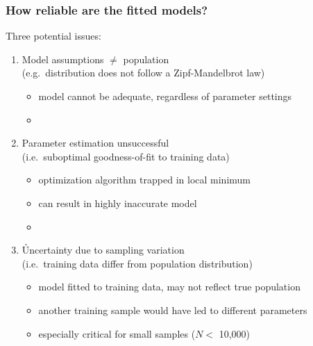\documentclass[t]{beamer} %
\begin{document}
\begin{frame}
  \frametitle{How reliable are the fitted models?}
  
  Three potential issues:
  \begin{enumerate}
  \item Model assumptions $\neq$ population\\
    (e.g.\ distribution does not follow a Zipf-Mandelbrot law)
    \begin{itemize}
    \item[\hand] model cannot be adequate, regardless of parameter settings
    \item[]
    \end{itemize}
  \item Parameter estimation unsuccessful\\
    (i.e.\ suboptimal goodness-of-fit to training data)
    \begin{itemize}
    \item[\hand] optimization algorithm trapped in local minimum
    \item[\hand] can result in highly inaccurate model
    \item[]
    \end{itemize}
  \item \h{Uncertainty due to sampling variation}\\
    (i.e.\ training data differ from population distribution)
    \begin{itemize}
    \item[\hand] model fitted to training data, may not reflect true population
    \item[\hand] another training sample would have led to different parameters
    \item[\hand] especially critical for small samples ($N < $ 10,000)
    \end{itemize}
  \end{enumerate}
\end{frame}
\end{document}
